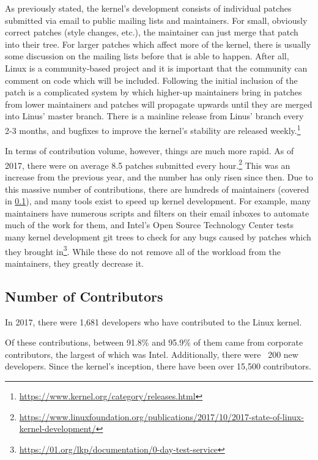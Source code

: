 \documentclass[11pt]{article}
\begin{document}
As previously stated, the kernel's development consists of individual patches submitted via email to public mailing lists and maintainers.  For small, obviously correct patches (style changes, etc.), the maintainer can just merge that patch into their tree.  For larger patches which affect more of the kernel, there is usually some discussion on the mailing lists before that is able to happen.  After all, Linux is a community-based project and it is important that the community can comment on code which will be included.  Following the initial inclusion of the patch is a complicated system by which higher-up maintainers bring in patches from lower maintainers and patches will propagate upwards until they are merged into Linus' master branch.  There is a mainline release from Linus' branch every 2-3 months, and bugfixes to improve the kernel's stability are released weekly.\footnote{\url{https://www.kernel.org/category/releases.html}}

	In terms of contribution volume, however, things are much more rapid.  As of 2017, there were on average 8.5 patches submitted every hour.\footnote{\url{https://www.linuxfoundation.org/publications/2017/10/2017-state-of-linux-kernel-development/}}  This was an increase from the previous year, and the number has only risen since then.  Due to this massive number of contributions, there are hundreds of maintainers (covered in \ref{subsec:kernel_contributors}), and many tools exist to speed up kernel development.  For example, many maintainers have numerous scripts and filters on their email inboxes to automate much of the work for them, and Intel's Open Source Technology Center tests many kernel development git trees to check for any bugs caused by patches which they brought in\footnote{\url{https://01.org/lkp/documentation/0-day-test-service}}.  While these do not remove all of the workload from the maintainers, they greatly decrease it.

\subsection{Number of Contributors}
\label{subsec:kernel_contributors}

In 2017, there were 1,681 developers who have contributed to the Linux kernel.\addtocounter{footnote}{-2}\addtocounter{Hfootnote}{-2}\footnotemark  Of these contributions, between 91.8\% and 95.9\% of them came from corporate contributors, the largest of which was Intel.  Additionally, there were ~200 new developers.  Since the kernel's inception, there have been over 15,500 contributors.
\end{document}
